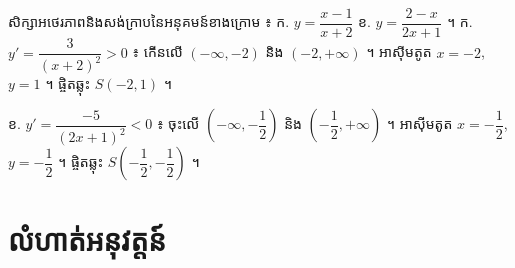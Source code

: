 \begin{pro}
សិក្សាអថេរភាពនិងសង់ក្រាបនៃអនុគមន៍ខាងក្រោម ៖ \quad ក. $y = \dfrac{x - 1}{x + 2}$ \quad ខ. $y = \dfrac{2 - x}{2x + 1}$ ។
\ans
ក. $y' = \dfrac{3}{(x + 2)^2} > 0$ ៖ កើនលើ $(-\infty, -2)$ និង $(-2, +\infty)$ ។ អាស៊ីមតូត $x = -2$, $y = 1$ ។ ផ្ចិតឆ្លុះ $S(-2, 1)$ ។

ខ. $y' = \dfrac{-5}{(2x + 1)^2} < 0$ ៖ ចុះលើ $\left(-\infty, -\dfrac{1}{2}\right)$ និង $\left(-\dfrac{1}{2}, +\infty\right)$ ។ អាស៊ីមតូត $x = -\dfrac{1}{2}$, $y = -\dfrac{1}{2}$ ។ ផ្ចិតឆ្លុះ $S\left(-\dfrac{1}{2}, -\dfrac{1}{2}\right)$ ។
\end{pro}

\section*{លំហាត់អនុវត្តន៍}
